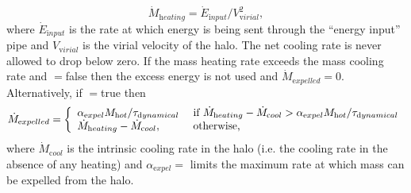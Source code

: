 \begin{equation}
 \dot{M}_{\mathrm heating} = \dot{E}_{\mathrm input} / V_{\mathrm virial}^2,
\end{equation}
where $\dot{E}_{\mathrm input}$ is the rate at which energy is being sent through the ``energy input'' pipe and $V_{\mathrm virial}$ is the virial velocity of the halo. The net cooling rate is never allowed to drop below zero. If the mass heating rate exceeds the mass cooling rate and {\normalfont \ttfamily [hotHaloExcessHeatDrivesOutflow]}$=${\normalfont \ttfamily false} then the excess energy is not used and $\dot{M}_{\mathrm expelled}=0$. Alternatively, if {\normalfont \ttfamily [hotHaloExcessHeatDrivesOutflow]}$=${\normalfont \ttfamily true} then
\begin{equation}
 \dot{M}_{\mathrm expelled} = \left\{ \begin{array}{ll} \alpha_{\mathrm expel} M_{\mathrm hot}/\tau_{\mathrm dynamical} & \hbox{ if } \dot{M}_{\mathrm heating} - \dot{M}_{\mathrm cool} > \alpha_{\mathrm expel} M_{\mathrm hot}/\tau_{\mathrm dynamical} \\ \dot{M}_{\mathrm heating} - \dot{M}_{\mathrm cool}, & \hbox{ otherwise,} \end{array} \right.
\end{equation}
where $\dot{M}_{\mathrm cool}$ is the intrinsic cooling rate in the halo (i.e. the cooling rate in the absence of any heating) and $\alpha_{\mathrm expel}=${\normalfont \ttfamily [hotHaloExpulsionRateMaximum]} limits the maximum rate at which mass can be expelled from the halo.


